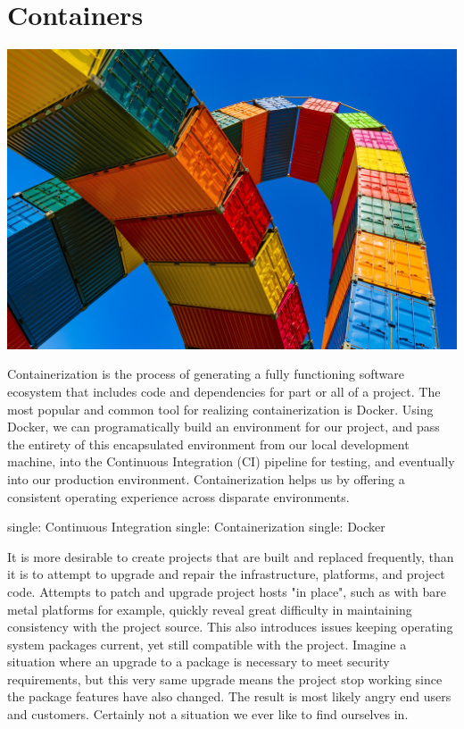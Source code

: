 \chapter{Containers}

\includegraphics{../images/container-4203677_1920.jpg}

\justify
Containerization is the process of generating a fully functioning
software ecosystem that includes code and dependencies for part or all
of a project. The most popular and common tool for realizing
containerization is Docker. Using Docker, we can programatically build
an environment for our project, and pass the entirety of this
encapsulated environment from our local development machine, into the
Continuous Integration (CI) pipeline for testing, and eventually into
our production environment. Containerization helps us by offering a
consistent operating experience across disparate environments.

single: Continuous Integration single: Containerization single: Docker

\justify
It is more desirable to create projects that are built and replaced
frequently, than it is to attempt to upgrade and repair the
infrastructure, platforms, and project code. Attempts to patch and
upgrade project hosts "in place", such as with bare metal platforms for
example, quickly reveal great difficulty in maintaining consistency with
the project source. This also introduces issues keeping operating system
packages current, yet still compatible with the project. Imagine a
situation where an upgrade to a package is necessary to meet security
requirements, but this very same upgrade means the project stop working
since the package features have also changed. The result is most likely
angry end users and customers. Certainly not a situation we ever like to
find ourselves in.

